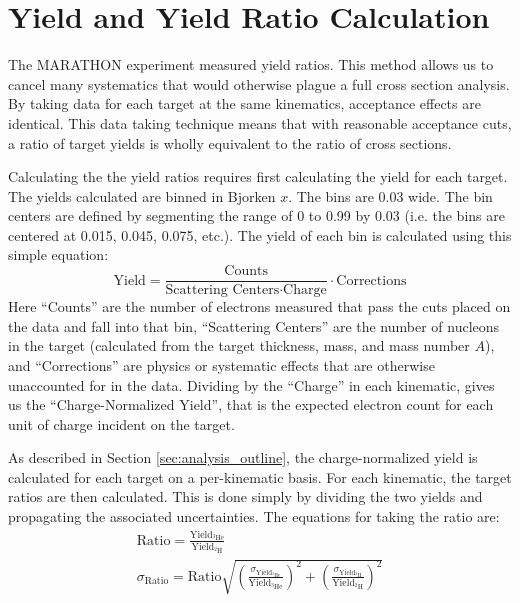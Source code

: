 \section{Yield and Yield Ratio Calculation}

The MARATHON experiment measured yield ratios. This method allows us to cancel many systematics that would otherwise plague a full cross section analysis. By taking data for each target at the same kinematics, acceptance effects are identical. This data taking technique means that with reasonable acceptance cuts, a ratio of target yields is wholly equivalent to the ratio of cross sections.

Calculating the the yield ratios requires first calculating the yield for each target. The yields calculated are binned in Bjorken $x$. The bins are 0.03 wide. The bin centers are defined by segmenting the range of 0 to 0.99 by 0.03 (i.e. the bins are centered at 0.015, 0.045, 0.075, etc.). The yield of each bin is calculated using this simple equation:
\begin{equation}
	\text{Yield} = \frac{\text{Counts}}{\text{Scattering Centers} \cdot \text{Charge}} \cdot \text{Corrections}
\end{equation}
Here ``Counts'' are the number of electrons measured that pass the cuts placed on the data and fall into that bin, ``Scattering Centers'' are the number of nucleons in the target (calculated from the target thickness, mass, and mass number $A$), and ``Corrections'' are physics or systematic effects that are otherwise unaccounted for in the data. Dividing by the ``Charge'' in each kinematic, gives us the ``Charge-Normalized Yield'', that is the expected electron count for each unit of charge incident on the target.

As described in Section \ref{sec:analysis_outline}, the charge-normalized yield is calculated for each target on a per-kinematic basis. For each kinematic, the target ratios are then calculated. This is done simply by dividing the two yields and propagating the associated uncertainties. The equations for taking the ratio are:
\begin{align}
	\text{Ratio} = \frac{\text{Yield}_{^3\text{He}}}{\text{Yield}_{^2\text{H}}} \\
	\sigma_{\text{Ratio}} = \text{Ratio}\sqrt{\left(\frac{\sigma_{\text{Yield}_{^3\text{He}}}}{\text{Yield}_{^3\text{He}}}\right)^2 + \left(\frac{\sigma_{\text{Yield}_{^2\text{H}}}}{\text{Yield}_{^2\text{H}}}\right)^2}
\end{align}

